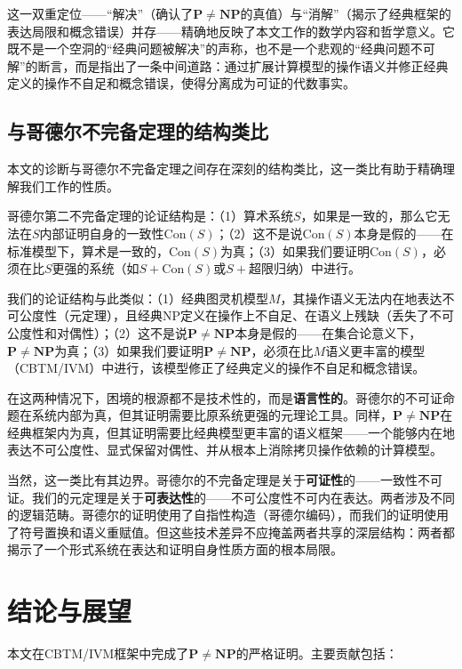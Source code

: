 \documentclass{ctexart}
\begin{document}
	这一双重定位——``解决''（确认了$\mathbf{P} \neq \mathbf{NP}$的真值）与``消解''（揭示了经典框架的表达局限和概念错误）并存——精确地反映了本文工作的数学内容和哲学意义。它既不是一个空洞的``经典问题被解决''的声称，也不是一个悲观的``经典问题不可解''的断言，而是指出了一条中间道路：通过扩展计算模型的操作语义并修正经典定义的操作不自足和概念错误，使得分离成为可证的代数事实。
	
	\subsection{与哥德尔不完备定理的结构类比}
	
	本文的诊断与哥德尔不完备定理之间存在深刻的结构类比，这一类比有助于精确理解我们工作的性质。
	
	哥德尔第二不完备定理的论证结构是：（1）算术系统$S$，如果是一致的，那么它无法在$S$内部证明自身的一致性$\mathrm{Con}(S)$；（2）这不是说$\mathrm{Con}(S)$本身是假的——在标准模型下，算术是一致的，$\mathrm{Con}(S)$为真；（3）如果我们要证明$\mathrm{Con}(S)$，必须在比$S$更强的系统（如$S+\mathrm{Con}(S)$或$S+$超限归纳）中进行。
	
	我们的论证结构与此类似：（1）经典图灵机模型$M$，其操作语义无法内在地表达不可公度性（元定理），且经典NP定义在操作上不自足、在语义上残缺（丢失了不可公度性和对偶性）；（2）这不是说$\mathbf{P} \neq \mathbf{NP}$本身是假的——在集合论意义下，$\mathbf{P} \neq \mathbf{NP}$为真；（3）如果我们要证明$\mathbf{P} \neq \mathbf{NP}$，必须在比$M$语义更丰富的模型（CBTM/IVM）中进行，该模型修正了经典定义的操作不自足和概念错误。
	
	在这两种情况下，困境的根源都不是技术性的，而是\textbf{语言性的}。哥德尔的不可证命题在系统内部为真，但其证明需要比原系统更强的元理论工具。同样，$\mathbf{P} \neq \mathbf{NP}$在经典框架内为真，但其证明需要比经典模型更丰富的语义框架——一个能够内在地表达不可公度性、显式保留对偶性、并从根本上消除拷贝操作依赖的计算模型。
	
	当然，这一类比有其边界。哥德尔的不完备定理是关于\textbf{可证性}的——一致性不可证。我们的元定理是关于\textbf{可表达性}的——不可公度性不可内在表达。两者涉及不同的逻辑范畴。哥德尔的证明使用了自指性构造（哥德尔编码），而我们的证明使用了符号置换和语义重赋值。但这些技术差异不应掩盖两者共享的深层结构：两者都揭示了一个形式系统在表达和证明自身性质方面的根本局限。
	
	\section{结论与展望}
	
	本文在CBTM/IVM框架中完成了$\mathbf{P} \neq \mathbf{NP}$的严格证明。主要贡献包括：
	
\end{document}
